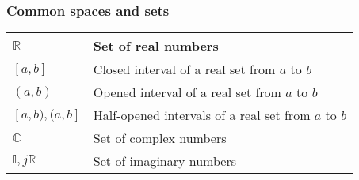 \subsubsection{Common spaces and sets}
\begin{xltabular}{\textwidth}{XX}
	\(\mathbb{R}\)                                                                                                                                          & Set of real numbers                                                                                                                                                                                                                                 \\ \hline
	\([a, b]\)                                                                                                                                              & Closed interval of a real set from \(a\) to \(b\)                                                                                                                                                                                                   \\ \hline
	\((a, b)\)                                                                                                                                              & Opened interval of a real set from \(a\) to \(b\)                                                                                                                                                                                                   \\ \hline
	\([a, b), (a, b]\)                                                                                                                                      & Half-opened intervals of a real set from \(a\) to \(b\)                                                                                                                                                                                             \\ \hline
	\(\mathbb{C}\)                                                                                                                                          & Set of complex numbers                                                                                                                                                                                                                              \\ \hline
	\(\mathbb{I}, j\mathbb{R}\)                                                                                                                             & Set of imaginary numbers                                                                                                                                                                                                                            \\ \hline

\end{xltabular}
